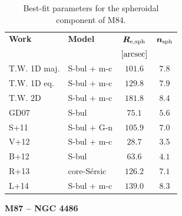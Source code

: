 \documentclass[preprint2]{emulateapj}
\begin{document}
  \begin{table}[h]
  \small
  \caption{Best-fit parameters for the spheroidal component of M84.}
  \begin{center}
  \begin{tabular}{llcc}
  \hline
  {\bf Work} & {\bf Model}   & $\bm R_{\rm e,sph}$    & $\bm n_{\rm sph}$ \\
    &  &  $[\rm arcsec]$ & \\
  \hline
  T.W. 1D maj. & S-bul + m-c   & $101.6$  &  $7.8$ \\
  T.W. 1D eq.  & S-bul + m-c   & $129.8$  &  $7.9$ \\
  T.W. 2D      & S-bul + m-c   & $181.8$  &  $8.4$ \\
  \hline
  GD07         & S-bul         & $75.1$   &  $5.6$ \\
  S+11         & S-bul + G-n   & $105.9$  &  $7.0$ \\
  V+12         & S-bul + m-c   & $28.7$   &  $3.5$ \\
  B+12         & S-bul         & $63.6$   &  $4.1$ \\
  R+13         & core-S\'ersic & $126.2$  &  $7.1$ \\
  L+14         & S-bul + m-c   & $139.0$  &  $8.3$ \\
  \hline
  \end{tabular}
  \end{center}
  \label{tab:m84}
  \end{table}

  \clearpage\newpage\noindent
  {\bf M87 -- NGC 4486 \\}
\end{document}
